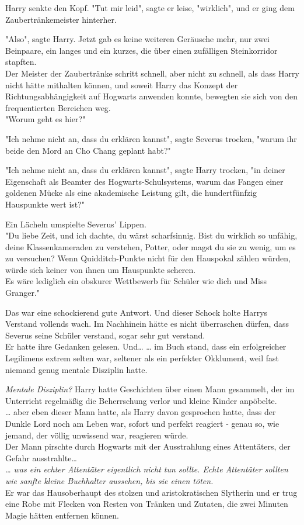 {Harry senkte den Kopf. "Tut mir leid", sagte er leise, "wirklich", und er ging dem Zaubertränkemeister hinterher.

"Also", sagte Harry. Jetzt gab es keine weiteren Geräusche mehr, nur zwei Beinpaare, ein langes und ein kurzes, die über einen zufälligen Steinkorridor stapften.\\ Der Meister der Zaubertränke schritt schnell, aber nicht zu schnell, als dass Harry nicht hätte mithalten können, und soweit Harry das Konzept der Richtungsabhängigkeit auf Hogwarts anwenden konnte, bewegten sie sich von den frequentierten Bereichen weg.\\ "Worum geht es hier?"

"Ich nehme nicht an, dass du erklären kannst", sagte Severus trocken, "warum ihr beide den Mord an Cho Chang geplant habt?"

"Ich nehme nicht an, dass du erklären kannst", sagte Harry trocken, "in deiner Eigenschaft als Beamter des Hogwarts-Schulsystems, warum das Fangen einer goldenen Mücke als eine akademische Leistung gilt, die hundertfünfzig Hauspunkte wert ist?"

Ein Lächeln umspielte Severus' Lippen.\\ "Du liebe Zeit, und ich dachte, du wärst scharfsinnig. Bist du wirklich so unfähig, deine Klassenkameraden zu verstehen, Potter, oder magst du sie zu wenig, um es zu versuchen? Wenn Quidditch-Punkte nicht für den Hauspokal zählen würden, würde sich keiner von ihnen um Hauspunkte scheren.\\ Es wäre lediglich ein obskurer Wettbewerb für Schüler wie dich und Miss Granger."

Das war eine schockierend gute Antwort. Und dieser Schock holte Harrys Verstand vollends wach. Im Nachhinein hätte es nicht überraschen dürfen, dass Severus seine Schüler verstand, sogar sehr gut verstand.\\ Er hatte ihre Gedanken gelesen. Und… … im Buch stand, dass ein erfolgreicher Legilimens extrem selten war, seltener als ein perfekter Okklument, weil fast niemand genug mentale Disziplin hatte.

\emph{Mentale Disziplin?} Harry hatte Geschichten über einen Mann gesammelt, der im Unterricht regelmäßig die Beherrschung verlor und kleine Kinder anpöbelte.\\ … aber eben dieser Mann hatte, als Harry davon gesprochen hatte, dass der Dunkle Lord noch am Leben war, sofort und perfekt reagiert - genau so, wie jemand, der völlig unwissend war, reagieren würde.\\ Der Mann pirschte durch Hogwarts mit der Ausstrahlung eines Attentäters, der Gefahr ausstrahlte…\\ \emph{… was ein echter Attentäter eigentlich nicht tun sollte. Echte Attentäter sollten wie sanfte kleine Buchhalter aussehen, bis sie einen töten.}\\ Er war das Hausoberhaupt des stolzen und aristokratischen Slytherin und er trug eine Robe mit Flecken von Resten von Tränken und Zutaten, die zwei Minuten Magie hätten entfernen können.

}
